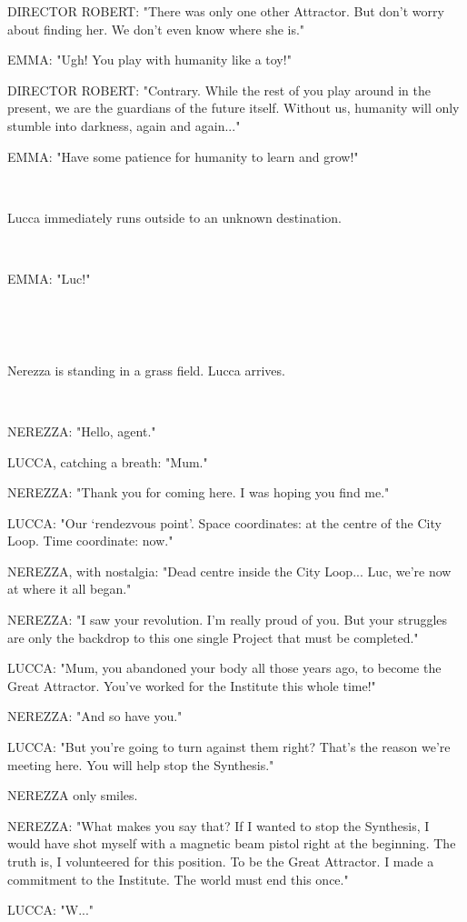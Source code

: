 \documentclass[11pt]{article}
\begin{document}
DIRECTOR ROBERT: "There was only one other Attractor. 
But don't worry about finding her. 
We don't even know where she is."

EMMA: "Ugh! You play with humanity like a toy!"

DIRECTOR ROBERT: "Contrary. 
While the rest of you play around in the present, we are the guardians of the future itself.
Without us, humanity will only stumble into darkness, again and again..."

EMMA: "Have some patience for humanity to learn and grow!"

\ 

Lucca immediately runs outside to an unknown destination.

\ 

EMMA: "Luc!"

\ 

\ 

Nerezza is standing in a grass field.
Lucca arrives. 

\ 

NEREZZA: "Hello, agent."

LUCCA, catching a breath: "Mum."

NEREZZA: "Thank you for coming here. 
I was hoping you find me."

LUCCA: "Our `rendezvous point'.
Space coordinates: at the centre of the City Loop. 
Time coordinate: now."

NEREZZA, with nostalgia: "Dead centre inside the City Loop...
Luc, we're now at where it all began."

NEREZZA: "I saw your revolution. 
I'm really proud of you.
But your struggles are only the backdrop to this one single Project that must be completed."

LUCCA: "Mum, you abandoned your body all those years ago, to become the Great Attractor.
You've worked for the Institute this whole time!"

NEREZZA: "And so have you."

LUCCA: "But you're going to turn against them right?
That's the reason we're meeting here.
You will help stop the Synthesis."

NEREZZA only smiles.

NEREZZA: "What makes you say that?
If I wanted to stop the Synthesis, I would have shot myself with a magnetic beam pistol right at the beginning.
The truth is, I volunteered for this position.
To be the Great Attractor.
I made a commitment to the Institute.
The world must end this once."

LUCCA: "W..."
\end{document}
